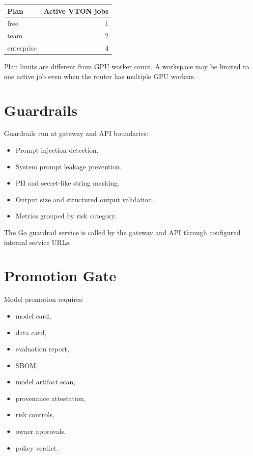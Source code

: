 \documentclass[12pt,a4paper,oneside]{report}
\begin{document}
\begin{center}
\begin{tabular}{lr}
\toprule
\textbf{Plan} & \textbf{Active VTON jobs} \\
\midrule
free & 1 \\
team & 2 \\
enterprise & 4 \\
\bottomrule
\end{tabular}
\end{center}

Plan limits are different from GPU worker count. A workspace may be limited to one active job even when the router has multiple GPU workers.

\section{Guardrails}

Guardrails run at gateway and API boundaries:

\begin{itemize}
  \item Prompt injection detection.
  \item System prompt leakage prevention.
  \item PII and secret-like string masking.
  \item Output size and structured output validation.
  \item Metrics grouped by risk category.
\end{itemize}

The Go guardrail service is called by the gateway and API through configured internal service URLs.

\section{Promotion Gate}

Model promotion requires:

\begin{itemize}
  \item model card,
  \item data card,
  \item evaluation report,
  \item SBOM,
  \item model artifact scan,
  \item provenance attestation,
  \item risk controls,
  \item owner approvals,
  \item policy verdict.
\end{itemize}
\end{document}
